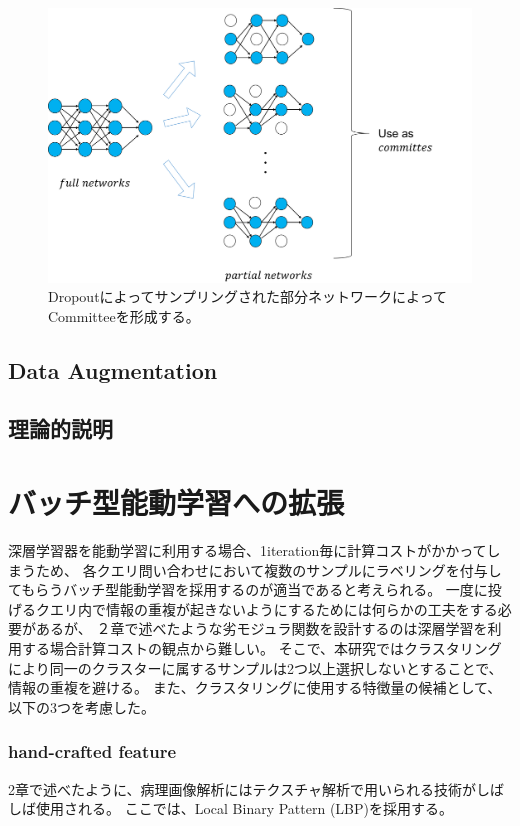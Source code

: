 \begin{figure}[tbp]
    \label{fig:query_by_dropout}
     \begin{center}
      \includegraphics[width=120mm]{figures/query_by_dropout.png}
     \end{center}
    \caption{Dropoutによってサンプリングされた部分ネットワークによってCommitteeを形成する。}
\end{figure}

\subsection{Data Augmentation}

\subsection{理論的説明}



\section{バッチ型能動学習への拡張}
深層学習器を能動学習に利用する場合、1iteration毎に計算コストがかかってしまうため、
各クエリ問い合わせにおいて複数のサンプルにラベリングを付与してもらうバッチ型能動学習を採用するのが適当であると考えられる。
一度に投げるクエリ内で情報の重複が起きないようにするためには何らかの工夫をする必要があるが、
２章で述べたような劣モジュラ関数を設計するのは深層学習を利用する場合計算コストの観点から難しい。
そこで、本研究ではクラスタリングにより同一のクラスターに属するサンプルは2つ以上選択しないとすることで、情報の重複を避ける。
また、クラスタリングに使用する特徴量の候補として、以下の3つを考慮した。

\subsubsection{hand-crafted feature}
2章で述べたように、病理画像解析にはテクスチャ解析で用いられる技術がしばしば使用される。
ここでは、Local Binary Pattern (LBP)を採用する。

